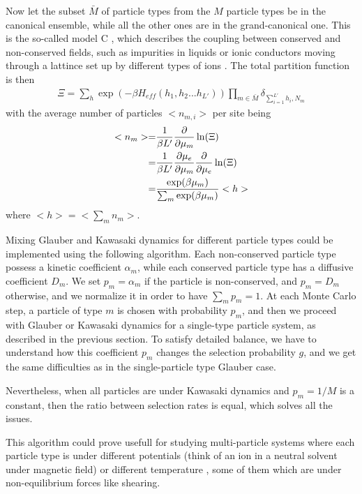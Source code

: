 Now let the subset $\bar{M}$ of particle types from the $M$ particle types be in the canonical ensemble, while all the other ones are in the grand-canonical one.  This is the so-called model C \cite{hohenberg_theory_1977}, which describes the coupling between conserved and non-conserved fields, such as impurities in liquids \cite{crisanti_dynamics_1992} or ionic conductors moving through a lattince set up by different types of ions \cite{dieterich_theoretical_1980,katz_nonequilibrium_1984}.
The total partition function is then
\begin{align}
    \Xi = \sum_h \exp \left( -\beta H_{eff}(h_1,h_2...h_{L'}) \right) \prod_{m \in \bar{M}}  \delta_{\sum_{i=1}^{L'} h_i,N_m}
\end{align}
with the average number of particles $<n_{m,i}>$ per site being
\begin{align}
    < n_m > =& \frac{1}{\beta L'} \frac{\partial}{\partial \mu_m} \ln(\Xi) \nonumber \\
    =& \frac{1}{\beta L'} \frac{\partial \mu_e}{\partial \mu_m} \frac{\partial}{\partial \mu_e} \ln(\Xi) \nonumber \\
    =& \frac{\exp(\beta \mu_m)}{\sum_m \exp(\beta \mu_m)} <h>
\end{align}
where $<h> = <\sum_m n_m>$. 


Mixing Glauber and Kawasaki dynamics for different particle types could be implemented using the following algorithm. Each non-conserved particle type possess a kinetic coefficient $\alpha_m$, while each conserved particle type has a diffusive coefficient $D_m$. We set $p_m = \alpha_m$ if the particle is non-conserved, and $p_m = D_m$ otherwise, and we normalize it in order to have $\sum_m p_m = 1$. At each Monte Carlo step, a particle of type $m$ is chosen with probability $p_m$, and then we proceed with Glauber or Kawasaki dynamics for a single-type particle system, as described in the previous section.
To satisfy detailed balance, we have to understand how this coefficient $p_m$ changes the selection probability $g$, and we get the same difficulties as in the single-particle type Glauber case.

Nevertheless, when all particles are under Kawasaki dynamics and $p_m = 1/M$ is a constant, then the ratio between selection rates is equal, which solves all the issues. 

This algorithm could prove usefull for studying multi-particle systems where each particle type is under different potentials (think of an ion in a neutral solvent under magnetic field) or different temperature \cite{grosberg_nonequilibrium_2015}, some of them which are under non-equilibrium forces like shearing.


